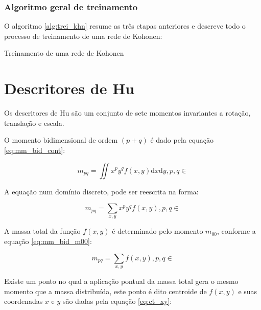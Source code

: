 \subsubsection{Algoritmo geral de treinamento}

O algoritmo \ref{alg:trei_khn} resume as três etapas anteriores e descreve
todo o processo de treinamento de uma rede de Kohonen:

\begin{algorithm}[H]
\caption{Treinamento de uma rede de Kohonen}\label{alg:trei_khn}
\end{algorithm}

\section{Descritores de Hu}\label{sec:desc_hu}

Os descritores de Hu são um conjunto de sete momentos invariantes a rotação,
translação e escala.

O momento bidimensional de ordem $ (p+q) $ é dado pela
equação \ref{eq:mm_bid_cont}:

\begin{equation}\label{eq:mm_bid_cont}
m_{pq} = \iint x^p y^q f(x, y) \mathrm{d}x \mathrm{d}y, p, q \in
\end{equation}

A equação num domínio discreto, pode ser reescrita na forma:

\begin{equation}\label{eq:mm_bid_disc}
m_{pq} = \sum_{x, y} x^p y^q f(x, y), p, q \in
\end{equation}

A massa total da função $ f(x, y) $ é determinado pelo
momento $ m_{00} $, conforme a equação \ref{eq:mm_bid_m00}:

\begin{equation}\label{eq:mm_bid_m00}
m_{pq} = \sum_{x, y} f(x, y), p, q \in
\end{equation}

Existe um ponto no qual a aplicação pontual da massa total gera o mesmo momento
que a massa distribuída, este ponto é dito centroide de $ f(x, y) $ e suas
coordenadas $ x $ e $ y $ são dadas pela equação \ref{eq:ct_xy}:

